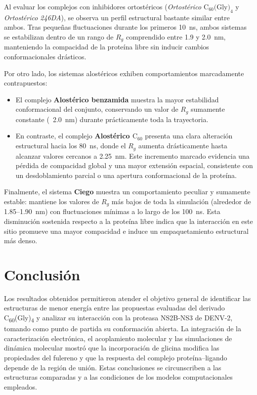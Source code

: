 \begin{table}[htbp]
Al evaluar los complejos con inhibidores ortostéricos (\textit{Ortostérico $\text{C}_{60}\text{(Gly)}_4$} y \textit{Ortostérico 246DA}), se observa un perfil estructural bastante similar entre ambos. Tras pequeñas fluctuaciones durante los primeros 10~ns, ambos sistemas se estabilizan dentro de un rango de $R_g$ comprendido entre 1.9 y 2.0~nm, manteniendo la compacidad de la proteína libre sin inducir cambios conformacionales drásticos.

Por otro lado, los sistemas alostéricos exhiben comportamientos marcadamente contrapuestos:
\begin{itemize}
    \item El complejo \textbf{Alostérico benzamida} muestra la mayor estabilidad conformacional del conjunto, conservando un valor de $R_g$ sumamente constante (~2.0~nm) durante prácticamente toda la trayectoria.
    \item En contraste, el complejo \textbf{Alostérico $\text{C}_{60}$} presenta una clara alteración estructural hacia los 80~ns, donde el $R_g$ aumenta drásticamente hasta alcanzar valores cercanos a 2.25~nm. Este incremento marcado evidencia una pérdida de compacidad global y una mayor extensión espacial, consistente con un desdoblamiento parcial o una apertura conformacional de la proteína.
\end{itemize}

Finalmente, el sistema \textbf{Ciego} muestra un comportamiento peculiar y sumamente estable: mantiene los valores de $R_g$ más bajos de toda la simulación (alrededor de 1.85--1.90~nm) con fluctuaciones mínimas a lo largo de los 100~ns. Esta disminución sostenida respecto a la proteína libre indica que la interacción en este sitio promueve una mayor compacidad e induce un empaquetamiento estructural más denso.

\section{Conclusión}

Los resultados obtenidos permitieron atender el objetivo general de identificar las estructuras de menor energía entre las propuestas evaluadas del derivado C\textsubscript{60}(Gly)\textsubscript{4} y analizar su interacción con la proteasa NS2B-NS3 de DENV-2, tomando como punto de partida su conformación abierta. La integración de la caracterización electrónica, el acoplamiento molecular y las simulaciones de dinámica molecular mostró que la incorporación de glicina modifica las propiedades del fulereno y que la respuesta del complejo proteína--ligando depende de la región de unión. Estas conclusiones se circunscriben a las estructuras comparadas y a las condiciones de los modelos computacionales empleados.


\end{table}
